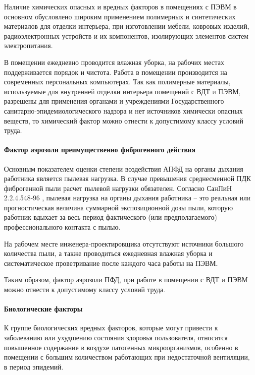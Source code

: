 Наличие химических опасных и вредных факторов в помещениях с ПЭВМ в основном
обусловлено широким применением полимерных и синтетических материалов для отделки
интерьера, при изготовлении мебели, ковровых изделий, радиоэлектронных устройств
и их компонентов, изолирующих элементов систем электропитания.

В помещении ежедневно проводится влажная уборка, на рабочих местах поддерживается
порядок и чистота. Работа в помещении производится на современных персональных
компьютерах. Так как полимерные материалы, используемые для внутренней отделки
интерьера помещений с ВДТ и ПЭВМ, разрешены для применения органами и учреждениями
Государственного санитарно-эпидемиологического надзора и нет источников химически
опасных веществ, то химический фактор можно отнести к допустимому классу условий
труда.

\paragraph{Фактор аэрозоли преимущественно фиброгенного действия}

Основным показателем оценки степени воздействия АПФД на органы дыхания работника
является пылевая нагрузка. В случае превышения среднесменной ПДК фиброгенной пыли
расчет пылевой нагрузки обязателен. Согласно СанПиН 2.2.4.548-96
\cite{ecology_sanpin_548_96}, пылевая нагрузка на органы дыхания работника – это
реальная или прогностическая величина суммарной экспозиционной дозы пыли, которую
работник вдыхает за весь период фактического (или предполагаемого) профессионального
контакта с пылью.

На рабочем месте инженера-проектировщика отсутствуют источники большого количества
пыли, а также проводиться ежедневная влажная уборка и систематическое проветривание
после каждого часа работы на ПЭВМ.

Таким образом, фактор аэрозоли ПФД, при работе в помещении с ВДТ и ПЭВМ можно
отнести к допустимому классу условий труда.

\paragraph{Биологические факторы}

К группе биологических вредных факторов, которые могут привести к заболеванию
или ухудшению состояния здоровья пользователя, относится повышенное содержание
в воздухе патогенных микроорганизмов, особенно в помещении с большим количеством
работающих при недостаточной вентиляции, в период эпидемий.

